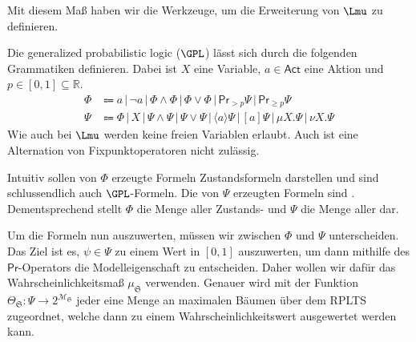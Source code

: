 Mit diesem Maß haben wir die Werkzeuge, um die Erweiterung von $\Lmu$ zu definieren.
\begin{definition}
	Die generalized probabilistic logic ($\GPL$) lässt sich durch die folgenden Grammatiken definieren. Dabei ist $X$ eine Variable, $a\in \mathsf{Act}$ eine Aktion und $p\in [0,1]\subseteq \mathbb{R}$.
	\begin{align*}
		\Phi &\Coloneqq a \,|\, \neg a \,|\, \Phi \land \Phi \,|\, \Phi\lor \Phi\,|\, \mathsf{Pr}_{>p}\Psi \,|\, \mathsf{Pr}_{\geq p}\Psi \\
		\Psi &\Coloneqq \Phi \,|\, X \,|\, \Psi\land\Psi \,|\, \Psi\lor \Psi \,|\, \langle a \rangle\Psi \,|\, [a]\Psi \,|\, \mu X.\Psi \,|\, \nu X.\Psi
	\end{align*}
	Wie auch bei $\Lmu$ werden keine freien Variablen erlaubt.
	Auch ist eine Alternation von Fixpunktoperatoren nicht zulässig.
	
	Intuitiv sollen von $\Phi$ erzeugte Formeln Zustandsformeln darstellen und sind schlussendlich auch $\GPL$-Formeln. Die von $\Psi$ erzeugten Formeln sind \fuzzy.
	Dementsprechend stellt $\Phi$ die Menge aller Zustands- und $\Psi$ die Menge aller \fuzzy dar.
\end{definition}

Um die Formeln nun auszuwerten, müssen wir zwischen $\Phi$ und $\Psi$ unterscheiden.
Das Ziel ist es, $\psi\in \Psi$ zu einem Wert in $[0,1]$ auszuwerten, um dann mithilfe des $\mathsf{Pr}$-Operators die Modelleigenschaft zu entscheiden.
Daher wollen wir dafür das Wahrscheinlichkeitsmaß $\mu_\mathfrak{S}$ verwenden.
Genauer wird mit der Funktion $\Theta_\mathfrak{S}:\Psi \to 2^{\mathcal{M}_\mathfrak{S}}$ jeder \fuzzy eine Menge an maximalen Bäumen über dem RPLTS zugeordnet, welche dann zu einem Wahrscheinlichkeitswert ausgewertet werden kann. \cite{cleaveland2005probabilistic}

